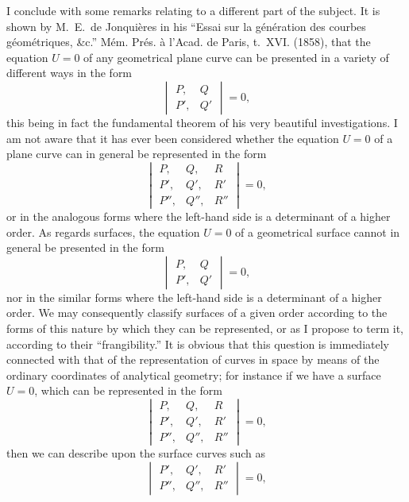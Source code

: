 \documentclass[11pt,a4paper]{article}
\theoremstyle{plain}
\begin{document}
I conclude with some remarks relating to a different part of the subject. It is shown by M.~E.~de Jonqui\`{e}res in his ``Essai sur la g\'{e}n\'{e}ration des courbes g\'{e}om\'{e}triques, \&c.'' M\'{e}m. Pr\'{e}s. \`{a} l'Acad. de Paris, t.~XVI. (1858), that the equation $U = 0$ of any geometrical plane curve can be presented in a variety of different ways in the form
\[
\begin{vmatrix}
P, & Q \\
P', & Q'
\end{vmatrix} = 0,
\]
this being in fact the fundamental theorem of his very beautiful investigations. I am not aware that it has ever been considered whether the equation $U = 0$ of a plane curve can in general be represented in the form
\[
\begin{vmatrix}
P, & Q, & R \\
P', & Q', & R' \\
P'', & Q'', & R''
\end{vmatrix} = 0,
\]
or in the analogous forms where the left-hand side is a determinant of a higher order. As regards surfaces, the equation $U = 0$ of a geometrical surface cannot in general be presented in the form
\[
\begin{vmatrix}
P, & Q \\
P', & Q'
\end{vmatrix} = 0,
\]
nor in the similar forms where the left-hand side is a determinant of a higher order. We may consequently classify surfaces of a given order according to the forms of this nature by which they can be represented, or as I propose to term it, according to their ``frangibility.'' It is obvious that this question is immediately connected with that of the representation of curves in space by means of the ordinary coordinates of analytical geometry; for instance if we have a surface $U = 0$, which can be represented in the form
\[
\begin{vmatrix}
P, & Q, & R \\
P', & Q', & R' \\
P'', & Q'', & R''
\end{vmatrix} = 0,
\]
then we can describe upon the surface curves such as
\[
\begin{vmatrix}
P', & Q', & R' \\
P'', & Q'', & R''
\end{vmatrix} = 0,
\]
\end{document}

